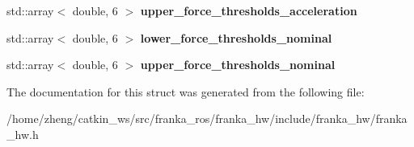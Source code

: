 \begin{DoxyCompactItemize}
std\+::array$<$ double, 6 $>$ {\bfseries upper\+\_\+force\+\_\+thresholds\+\_\+acceleration}
\item 
\mbox{\label{structfranka__hw_1_1_franka_h_w_1_1_collision_config_a5d0ad10f653b9a6e9f3d3d49bf6fb580}} 
std\+::array$<$ double, 6 $>$ {\bfseries lower\+\_\+force\+\_\+thresholds\+\_\+nominal}
\item 
\mbox{\label{structfranka__hw_1_1_franka_h_w_1_1_collision_config_aa2e0d4ca276032df2e767bbe4b8bb77d}} 
std\+::array$<$ double, 6 $>$ {\bfseries upper\+\_\+force\+\_\+thresholds\+\_\+nominal}
\end{DoxyCompactItemize}


The documentation for this struct was generated from the following file\+:\begin{DoxyCompactItemize}
\item 
/home/zheng/catkin\+\_\+ws/src/franka\+\_\+ros/franka\+\_\+hw/include/franka\+\_\+hw/franka\+\_\+hw.\+h\end{DoxyCompactItemize}
